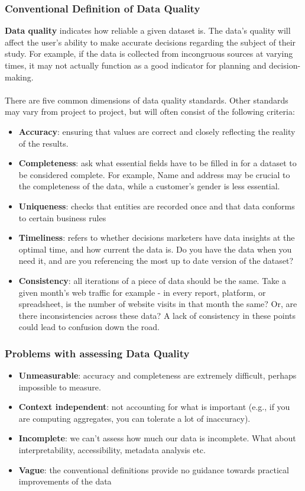 \documentclass[10pt,a4paper]{article}
\newcommand{\nline}{\\~\\}
\begin{document}
 \subsubsection{Conventional Definition of Data Quality}
 \textbf{Data quality} indicates how reliable a given dataset is. The data’s quality will affect the user’s ability to make accurate decisions regarding the subject of their study. For example, if the data is collected from incongruous sources at varying times, it may not actually function as a good indicator for planning and decision-making.
\nline
There are five common dimensions of data quality standards. Other standards may vary from project to project, but will often consist of the following criteria:
\begin{itemize}
	\item \textbf{Accuracy}: ensuring that values are correct and closely reflecting the reality of the results. 
	\item \textbf{Completeness}: ask what essential fields have to be filled in for a dataset to be considered complete. For example, Name and address may be crucial to the completeness of the data, while a customer’s gender is less essential. 
	\item \textbf{Uniqueness}: checks that entities are recorded once  and that data conforms to certain business rules
	\item \textbf{Timeliness}: refers to whether decisions marketers have data insights at the optimal time, and how current the data is.  Do you have the data when you need it, and are you referencing the most up to date version of the dataset?
	\item \textbf{Consistency}: all iterations of a piece of data should be the same. Take a given month’s web traffic for example - in every report, platform, or spreadsheet, is the number of website visits in that month the same? Or, are there inconsistencies across these data? A lack of consistency in these points could lead to confusion down the road. 
\end{itemize}
\subsubsection{Problems with assessing Data Quality}
\begin{itemize}
	\item \textbf{Unmeasurable}: accuracy and completeness are extremely difficult, perhaps impossible to measure.
	\item \textbf{Context independent}: not accounting for what is important (e.g., if you are computing aggregates, you can tolerate a lot of inaccuracy).
	\item \textbf{Incomplete}: we can't assess how much our data is incomplete. What about interpretability, accessibility, metadata analysis etc.
	\item \textbf{Vague}: the conventional definitions provide no guidance towards practical improvements of the data
\end{itemize}
\pagebreak
\end{document}
